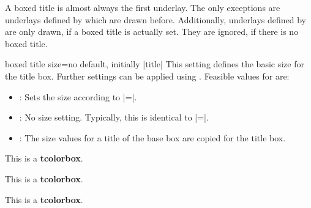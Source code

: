 \begin{marker}
  A boxed title is almost always the first underlay. The only exceptions are
  underlays defined by  which are drawn
  before. Additionally, underlays defined by 
  are only drawn, if a boxed title is actually set. They are ignored, if
  there is no boxed title.
\end{marker}



\begin{docTcbKey}[][doc new=2016-02-26]{boxed title size}{=}{no default, initially |title|}
  This setting defines the basic size for the title box. Further settings
  can be applied using .
  Feasible values for  are:
  \begin{itemize}
  \item{}: Sets the size according to |=|.
  \item{}: No size setting. Typically, this is identical to
    |=|.
  \item{}: The size values for a title of the base box are copied
    for the title box.
  \end{itemize}

\begin{dispExample}
\begin{tcbraster}[raster columns=3,enhanced,boxrule=0.4pt,
    title=My title,attach boxed title to top center]
  \begin{tcolorbox}[boxed title size=title]
    This is a \textbf{tcolorbox}.
  \end{tcolorbox}
  \begin{tcolorbox}[boxed title size=standard]
    This is a \textbf{tcolorbox}.
  \end{tcolorbox}
  \begin{tcolorbox}[boxed title size=copy]
    This is a \textbf{tcolorbox}.
  \end{tcolorbox}
\end{tcbraster}
\end{dispExample}

\end{docTcbKey}



